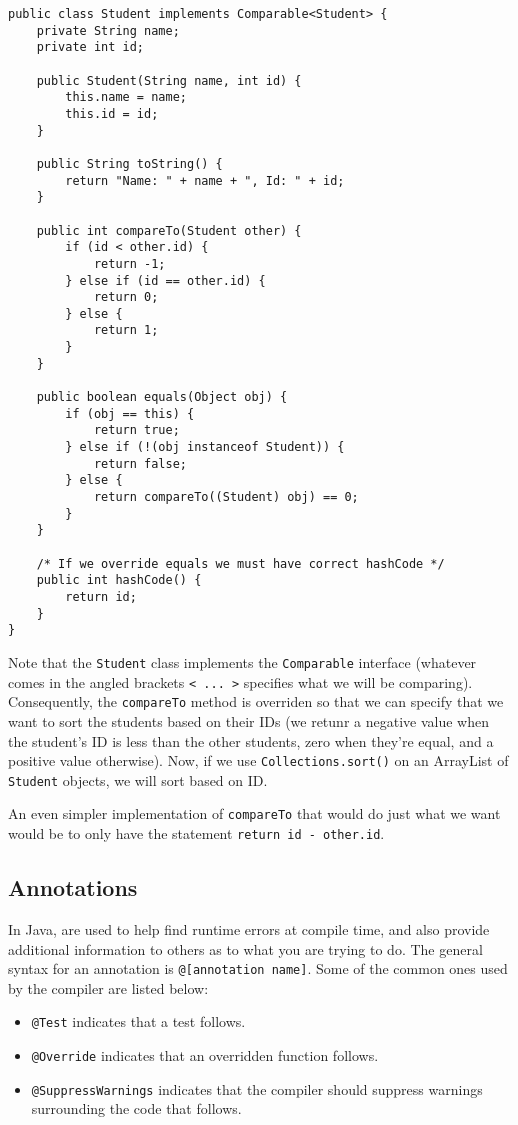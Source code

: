 \begin{lstlisting}
public class Student implements Comparable<Student> {
	private String name;
	private int id;

	public Student(String name, int id) {
		this.name = name;
		this.id = id;
	}

	public String toString() {
		return "Name: " + name + ", Id: " + id;
	}

	public int compareTo(Student other) {
		if (id < other.id) {
			return -1;
		} else if (id == other.id) {
			return 0;
		} else {
			return 1;
		}
	}

	public boolean equals(Object obj) {
		if (obj == this) {
			return true;
		} else if (!(obj instanceof Student)) {
			return false;
		} else {
			return compareTo((Student) obj) == 0;
		}
	}

	/* If we override equals we must have correct hashCode */
	public int hashCode() {
		return id;
	}
}
\end{lstlisting}

Note that the \verb!Student! class implements the \verb!Comparable! interface (whatever comes in the angled brackets \verb!< ... >! specifies what we will be comparing). Consequently, the  \verb!compareTo! method is overriden so that we can specify that we want to sort the students based on their IDs (we retunr a negative value when the student's ID is less than the other students, zero when they're equal, and a positive value otherwise). Now, if we use \verb!Collections.sort()! on an ArrayList of \verb!Student! objects, we will sort based on ID. 

An even simpler implementation of \verb!compareTo! that would do just what we want would be to only have the statement \verb!return id - other.id!.


\subsection{Annotations}
In Java,  are used to help find runtime errors at compile time, and also provide additional information to others as to what you are trying to do. The general syntax for an annotation is \verb!@[annotation name]!. Some of the common ones used by the compiler are listed below:
\begin{itemize}
    \item \verb!@Test! indicates that a test follows.
    \item \verb!@Override! indicates that an overridden function follows.
    \item \verb!@SuppressWarnings! indicates that the compiler should suppress warnings surrounding the code that follows.
\end{itemize}

